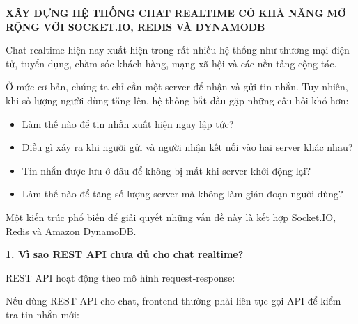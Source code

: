 \vspace{0.5em}\noindent\textbf{XÂY DỰNG HỆ THỐNG CHAT REALTIME CÓ KHẢ NĂNG MỞ RỘNG VỚI
SOCKET.IO, REDIS VÀ
DYNAMODB}\par

Chat realtime hiện nay xuất hiện trong rất nhiều hệ thống như thương mại
điện tử, tuyển dụng, chăm sóc khách hàng, mạng xã hội và các nền tảng
cộng tác.

Ở mức cơ bản, chúng ta chỉ cần một server để nhận và gửi tin nhắn. Tuy
nhiên, khi số lượng người dùng tăng lên, hệ thống bắt đầu gặp những câu
hỏi khó hơn:

\begin{itemize}
\tightlist
\item
  Làm thế nào để tin nhắn xuất hiện ngay lập tức?
\item
  Điều gì xảy ra khi người gửi và người nhận kết nối vào hai server khác
  nhau?
\item
  Tin nhắn được lưu ở đâu để không bị mất khi server khởi động lại?
\item
  Làm thế nào để tăng số lượng server mà không làm gián đoạn người dùng?
\end{itemize}

Một kiến trúc phổ biến để giải quyết những vấn đề này là kết hợp
Socket.IO, Redis và Amazon DynamoDB.

\vspace{0.5em}\noindent\textbf{1. Vì sao REST API chưa đủ cho chat
realtime?}\par

REST API hoạt động theo mô hình request-response:

\begin{Shaded}
\begin{Highlighting}[]
\end{Highlighting}
\end{Shaded}

Nếu dùng REST API cho chat, frontend thường phải liên tục gọi API để
kiểm tra tin nhắn mới:

\begin{Shaded}
\begin{Highlighting}[]
\end{Highlighting}
\end{Shaded}

